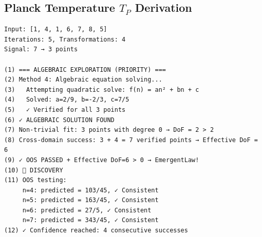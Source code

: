 \documentclass[11pt,a4paper]{article}
\begin{document}
\subsection{Planck Temperature $T_P$ Derivation}

\begin{verbatim}
Input: [1, 4, 1, 6, 7, 8, 5]
Iterations: 5, Transformations: 4
Signal: 7 → 3 points

(1) === ALGEBRAIC EXPLORATION (PRIORITY) ===
(2) Method 4: Algebraic equation solving...
(3)   Attempting quadratic solve: f(n) = an² + bn + c
(4)   Solved: a=2/9, b=-2/3, c=7/5
(5)   ✓ Verified for all 3 points
(6) ✓ ALGEBRAIC SOLUTION FOUND
(7) Non-trivial fit: 3 points with degree 0 → DoF = 2 > 2
(8) Cross-domain success: 3 + 4 = 7 verified points → Effective DoF = 6
(9) ✓ OOS PASSED + Effective DoF=6 > 0 → EmergentLaw!
(10) 🎯 DISCOVERY
(11) OOS testing:
     n=4: predicted = 103/45, ✓ Consistent
     n=5: predicted = 163/45, ✓ Consistent
     n=6: predicted = 27/5, ✓ Consistent
     n=7: predicted = 343/45, ✓ Consistent
(12) ✓ Confidence reached: 4 consecutive successes
\end{verbatim}
\end{document}

